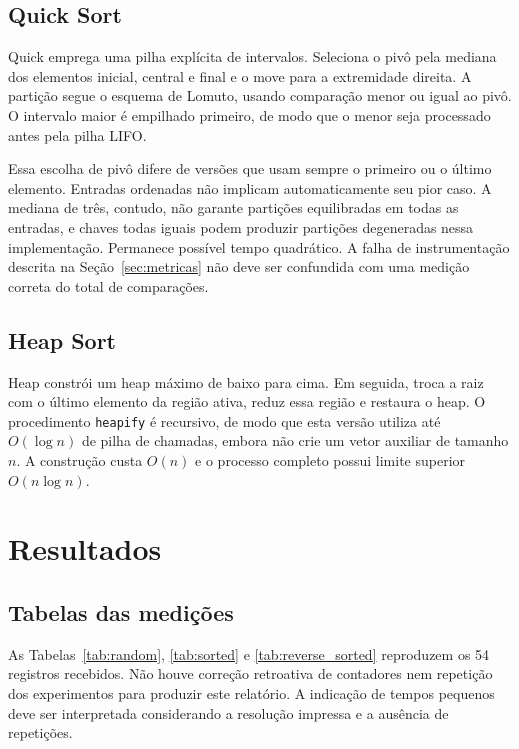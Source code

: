\documentclass[12pt]{uftex}
\begin{document}
\section{Quick Sort}
Quick emprega uma pilha explícita de intervalos. Seleciona o pivô pela mediana dos elementos inicial, central e final e o move para a extremidade direita. A partição segue o esquema de Lomuto, usando comparação menor ou igual ao pivô. O intervalo maior é empilhado primeiro, de modo que o menor seja processado antes pela pilha LIFO.

Essa escolha de pivô difere de versões que usam sempre o primeiro ou o último elemento. Entradas ordenadas não implicam automaticamente seu pior caso. A mediana de três, contudo, não garante partições equilibradas em todas as entradas, e chaves todas iguais podem produzir partições degeneradas nessa implementação. Permanece possível tempo quadrático. A falha de instrumentação descrita na Seção~\ref{sec:metricas} não deve ser confundida com uma medição correta do total de comparações.

\section{Heap Sort}
Heap constrói um heap máximo de baixo para cima. Em seguida, troca a raiz com o último elemento da região ativa, reduz essa região e restaura o heap. O procedimento \texttt{heapify} é recursivo, de modo que esta versão utiliza até $O(\log n)$ de pilha de chamadas, embora não crie um vetor auxiliar de tamanho $n$. A construção custa $O(n)$ e o processo completo possui limite superior $O(n\log n)$.

\chapter{Resultados}
\section{Tabelas das medições}
As Tabelas~\ref{tab:random}, \ref{tab:sorted} e \ref{tab:reverse_sorted} reproduzem os 54 registros recebidos. Não houve correção retroativa de contadores nem repetição dos experimentos para produzir este relatório. A indicação de tempos pequenos deve ser interpretada considerando a resolução impressa e a ausência de repetições.

\clearpage

\clearpage

\clearpage
\end{document}
